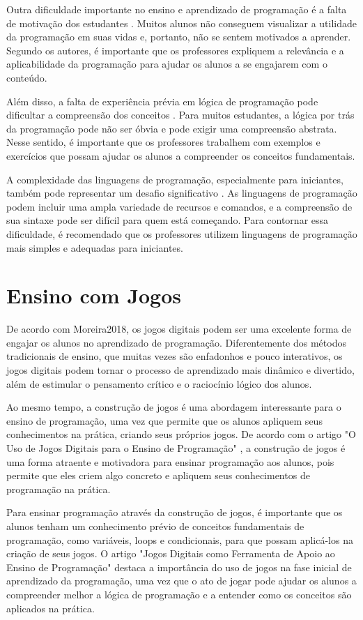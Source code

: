 Outra dificuldade importante no ensino e aprendizado de programação é a falta de motivação dos estudantes \cite{Silva2014}. Muitos alunos não conseguem visualizar a utilidade da programação em suas vidas e, portanto, não se sentem motivados a aprender. Segundo os autores, é importante que os professores expliquem a relevância e a aplicabilidade da programação para ajudar os alunos a se engajarem com o conteúdo.

Além disso, a falta de experiência prévia em lógica de programação pode dificultar a compreensão dos conceitos \cite{Silva2014}. Para muitos estudantes, a lógica por trás da programação pode não ser óbvia e pode exigir uma compreensão abstrata. Nesse sentido, é importante que os professores trabalhem com exemplos e exercícios que possam ajudar os alunos a compreender os conceitos fundamentais.

A complexidade das linguagens de programação, especialmente para iniciantes, também pode representar um desafio significativo \cite{Silva2014}. As linguagens de programação podem incluir uma ampla variedade de recursos e comandos, e a compreensão de sua sintaxe pode ser difícil para quem está começando. Para contornar essa dificuldade, é recomendado que os professores utilizem linguagens de programação mais simples e adequadas para iniciantes.

\section{Ensino com Jogos}

De acordo com {Moreira2018}, os jogos digitais podem ser uma excelente forma de engajar os alunos no aprendizado de programação. Diferentemente dos métodos tradicionais de ensino, que muitas vezes são enfadonhos e pouco interativos, os jogos digitais podem tornar o processo de aprendizado mais dinâmico e divertido, além de estimular o pensamento crítico e o raciocínio lógico dos alunos.

Ao mesmo tempo, a construção de jogos é uma abordagem interessante para o ensino de programação, uma vez que permite que os alunos apliquem seus conhecimentos na prática, criando seus próprios jogos. De acordo com o artigo "O Uso de Jogos Digitais para o Ensino de Programação" \cite{Moreira2018}, a construção de jogos é uma forma atraente e motivadora para ensinar programação aos alunos, pois permite que eles criem algo concreto e apliquem seus conhecimentos de programação na prática.

Para ensinar programação através da construção de jogos, é importante que os alunos tenham um conhecimento prévio de conceitos fundamentais de programação, como variáveis, loops e condicionais, para que possam aplicá-los na criação de seus jogos. O artigo "Jogos Digitais como Ferramenta de Apoio ao Ensino de Programação" \cite{Pereira2016} destaca a importância do uso de jogos na fase inicial de aprendizado da programação, uma vez que o ato de jogar pode ajudar os alunos a compreender melhor a lógica de programação e a entender como os conceitos são aplicados na prática.


